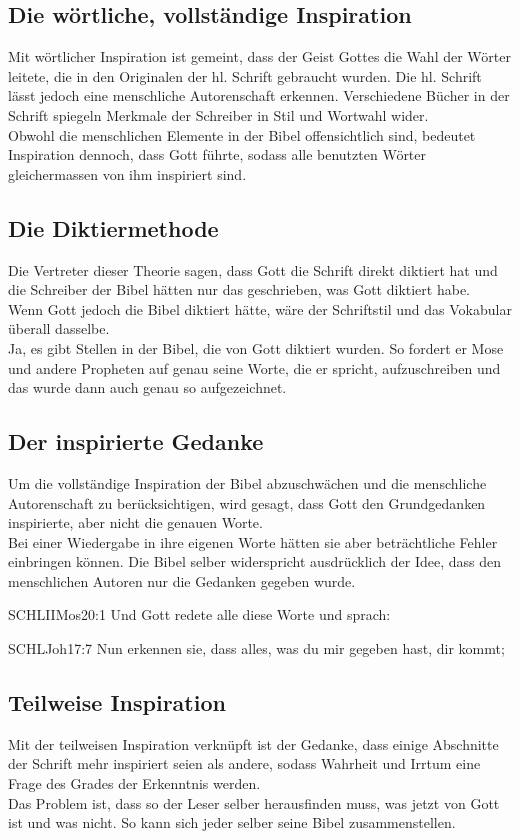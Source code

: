 \subsection{Die wörtliche, vollständige Inspiration}
Mit wörtlicher Inspiration ist gemeint, dass der Geist Gottes die Wahl der Wörter leitete, die in den Originalen der hl. Schrift gebraucht wurden. Die hl. Schrift lässt jedoch eine menschliche Autorenschaft erkennen. Verschiedene Bücher in der Schrift spiegeln Merkmale der Schreiber in Stil und Wortwahl wider.\\
Obwohl die menschlichen Elemente in der Bibel offensichtlich sind, bedeutet Inspiration dennoch, dass Gott führte, sodass alle benutzten Wörter gleichermassen von ihm inspiriert sind.
\subsection{Die Diktiermethode}
Die Vertreter dieser Theorie sagen, dass Gott die Schrift direkt diktiert hat und die Schreiber der Bibel hätten nur das geschrieben, was Gott diktiert habe.\\
Wenn Gott jedoch die Bibel diktiert hätte, wäre der Schriftstil und das Vokabular überall dasselbe.\\
Ja, es gibt Stellen in der Bibel, die von Gott diktiert wurden. So fordert er Mose und andere Propheten auf genau seine Worte, die er spricht, aufzuschreiben und das wurde dann auch genau so aufgezeichnet.
\subsection{Der inspirierte Gedanke}
Um die vollständige Inspiration  der Bibel abzuschwächen und die menschliche Autorenschaft zu berücksichtigen, wird gesagt, dass Gott den Grundgedanken inspirierte, aber nicht die genauen Worte.\\
Bei einer Wiedergabe in ihre eigenen Worte hätten sie aber beträchtliche Fehler einbringen können. Die Bibel selber widerspricht ausdrücklich der Idee, dass den menschlichen Autoren nur die Gedanken gegeben wurde.
\begin{bibelbox}{SCHL}{IIMos}{20:1}
Und Gott redete alle diese Worte und sprach:
\end{bibelbox}
\begin{bibelbox}{SCHL}{Joh}{17:7}
Nun erkennen sie, dass alles, was du mir gegeben hast, dir kommt;
\end{bibelbox}
\subsection{Teilweise Inspiration}
Mit der teilweisen Inspiration verknüpft ist der Gedanke, dass einige Abschnitte der Schrift mehr inspiriert seien als andere, sodass Wahrheit und Irrtum eine Frage des Grades der Erkenntnis werden.\\
Das Problem ist, dass so der Leser selber herausfinden muss, was jetzt von Gott ist und was nicht. So kann sich jeder selber seine Bibel zusammenstellen.
